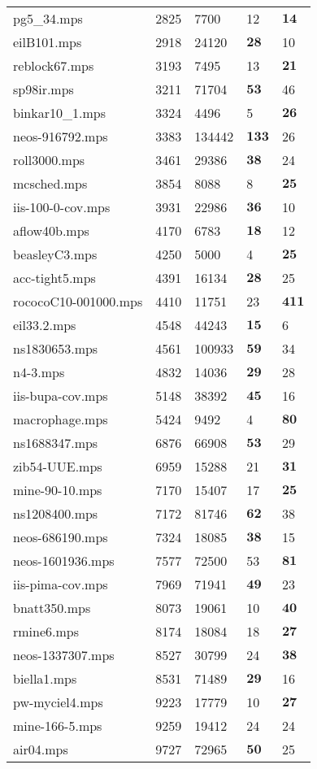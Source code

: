\documentclass{article}
\begin{document}
\begin{longtable}{|l |l |l |l |l |}
pg5_34.mps&2825&7700&12&$\mathbf{14}$\\
eilB101.mps&2918&24120&$\mathbf{28}$&10\\
reblock67.mps&3193&7495&13&$\mathbf{21}$\\
sp98ir.mps&3211&71704&$\mathbf{53}$&46\\
binkar10_1.mps&3324&4496&5&$\mathbf{26}$\\
neos-916792.mps&3383&134442&$\mathbf{133}$&26\\
roll3000.mps&3461&29386&$\mathbf{38}$&24\\
mcsched.mps&3854&8088&8&$\mathbf{25}$\\
iis-100-0-cov.mps&3931&22986&$\mathbf{36}$&10\\
aflow40b.mps&4170&6783&$\mathbf{18}$&12\\
beasleyC3.mps&4250&5000&4&$\mathbf{25}$\\
acc-tight5.mps&4391&16134&$\mathbf{28}$&25\\
rococoC10-001000.mps&4410&11751&23&$\mathbf{411}$\\
eil33.2.mps&4548&44243&$\mathbf{15}$&6\\
ns1830653.mps&4561&100933&$\mathbf{59}$&34\\
n4-3.mps&4832&14036&$\mathbf{29}$&28\\
iis-bupa-cov.mps&5148&38392&$\mathbf{45}$&16\\
macrophage.mps&5424&9492&4&$\mathbf{80}$\\
ns1688347.mps&6876&66908&$\mathbf{53}$&29\\
zib54-UUE.mps&6959&15288&21&$\mathbf{31}$\\
mine-90-10.mps&7170&15407&17&$\mathbf{25}$\\
ns1208400.mps&7172&81746&$\mathbf{62}$&38\\
neos-686190.mps&7324&18085&$\mathbf{38}$&15\\
neos-1601936.mps&7577&72500&53&$\mathbf{81}$\\
iis-pima-cov.mps&7969&71941&$\mathbf{49}$&23\\
bnatt350.mps&8073&19061&10&$\mathbf{40}$\\
rmine6.mps&8174&18084&18&$\mathbf{27}$\\
neos-1337307.mps&8527&30799&24&$\mathbf{38}$\\
biella1.mps&8531&71489&$\mathbf{29}$&16\\
pw-myciel4.mps&9223&17779&10&$\mathbf{27}$\\
mine-166-5.mps&9259&19412&24&24\\
air04.mps&9727&72965&$\mathbf{50}$&25\\

\end{longtable}
\end{document}
